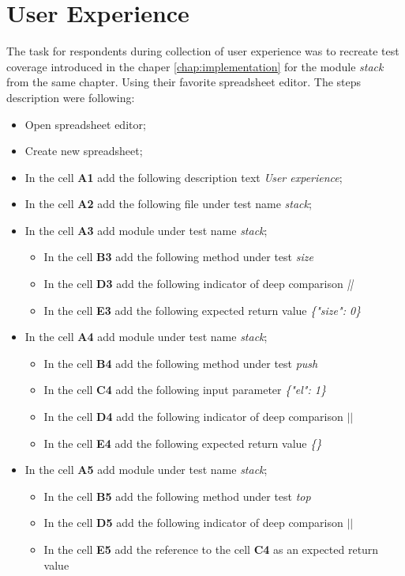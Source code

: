 \chapter{User Experience}
The task for respondents during collection of user experience was to recreate test coverage introduced in the chaper \ref{chap:implementation} for the module \textit{stack} from the same chapter. Using their favorite spreadsheet editor.
The steps description were following:
\begin{itemize}
	\item Open spreadsheet editor;
	\item Create new spreadsheet;
	\item In the cell \textbf{A1} add the following description text \textit{User experience};
	\item In the cell \textbf{A2} add the following file under test name \textit{stack};
	\item In the cell \textbf{A3} add  module under test name \textit{stack};
	\begin{itemize}
		\item In the cell \textbf{B3} add the following method under test \textit{size}
		\item In the cell \textbf{D3} add the following indicator of deep comparison \textit{||}
		\item In the cell \textbf{E3} add the following expected return value \textit{\{"size": 0\}}
	\end{itemize}
	\item In the cell \textbf{A4} add  module under test name \textit{stack};
	\begin{itemize}
		\item In the cell \textbf{B4} add the following method under test \textit{push}
		\item In the cell \textbf{C4} add the following input parameter \textit{\{"el": 1\}}
		\item In the cell \textbf{D4} add the following indicator of deep comparison \textit{$||$}
		\item In the cell \textbf{E4} add the following expected return value \textit{\{\}}
	\end{itemize}
	\item In the cell \textbf{A5} add  module under test name \textit{stack};
	\begin{itemize}
		\item In the cell \textbf{B5} add the following method under test \textit{top}
		\item In the cell \textbf{D5} add the following indicator of deep comparison \textit{$||$}
		\item In the cell \textbf{E5} add the reference to the cell \textbf{C4} as an expected return value
	\end{itemize}
	

\end{itemize}

